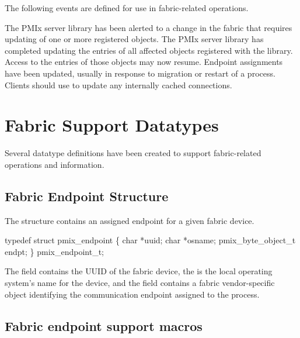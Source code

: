 The following events are defined for use in fabric-related operations.

\begin{constantdesc}
%
The \ac{PMIx} server library has been alerted to a change in the fabric that requires updating of one or more registered  objects.
%
The \ac{PMIx} server library has completed updating the entries of all affected  objects registered with the library. Access to the entries of those objects may now resume.
%
Endpoint assignments have been updated, usually in response to migration
or restart of a process. Clients should use  to update any
internally cached connections.
%
\end{constantdesc}

\section{Fabric Support Datatypes}

Several datatype definitions have been created to support fabric-related operations and information.

\subsection{Fabric Endpoint Structure}

The  structure contains an assigned endpoint for a given fabric device.

\cspecificstart
\begin{codepar}
typedef struct pmix_endpoint \{
    char *uuid;
    char *osname;
    pmix_byte_object_t endpt;
\} pmix_endpoint_t;
\end{codepar}
\cspecificend

The  field contains the \ac{UUID} of the fabric device, the  is the local operating system's name for the device, and the  field contains a fabric vendor-specific object identifying the communication endpoint assigned to the process.


\subsection{Fabric endpoint support macros}
\label{api:netend:macros}

